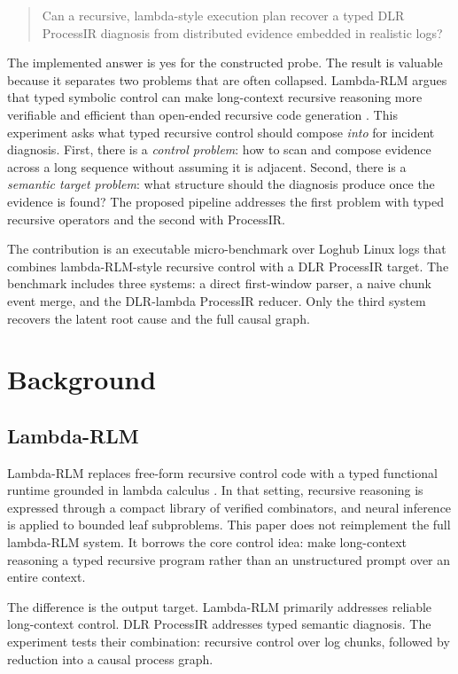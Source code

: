 \documentclass[11pt]{article}
\begin{document}
\begin{quote}
Can a recursive, lambda-style execution plan recover a typed DLR ProcessIR
diagnosis from distributed evidence embedded in realistic logs?
\end{quote}

The implemented answer is yes for the constructed probe. The result is valuable
because it separates two problems that are often collapsed. Lambda-RLM argues
that typed symbolic control can make long-context recursive reasoning more
verifiable and efficient than open-ended recursive code generation
\cite{lambda_rlm}. This experiment asks what typed recursive control should
compose \emph{into} for incident diagnosis. First, there is a
\emph{control problem}: how to scan and compose evidence across a long sequence
without assuming it is adjacent. Second, there is a \emph{semantic target
problem}: what structure should the diagnosis produce once the evidence is
found? The proposed pipeline addresses the first problem with typed recursive
operators and the second with ProcessIR.

The contribution is an executable micro-benchmark over Loghub Linux logs
\cite{loghub_repo,loghub_issre,loghub2_issta} that combines lambda-RLM-style
recursive control with a DLR ProcessIR target. The benchmark includes three
systems: a direct first-window parser, a naive chunk event merge, and the
DLR-lambda ProcessIR reducer. Only the third system recovers the latent root
cause and the full causal graph.

\section{Background}

\subsection{Lambda-RLM}

Lambda-RLM replaces free-form recursive control code with a typed functional
runtime grounded in lambda calculus \cite{lambda_rlm}. In that setting,
recursive reasoning is expressed through a compact library of verified
combinators, and neural inference is applied to bounded leaf subproblems. This
paper does not reimplement the full lambda-RLM system. It borrows the core
control idea: make long-context reasoning a typed recursive program rather than
an unstructured prompt over an entire context.

The difference is the output target. Lambda-RLM primarily addresses reliable
long-context control. DLR ProcessIR addresses typed semantic diagnosis. The
experiment tests their combination: recursive control over log chunks, followed
by reduction into a causal process graph.
\end{document}
